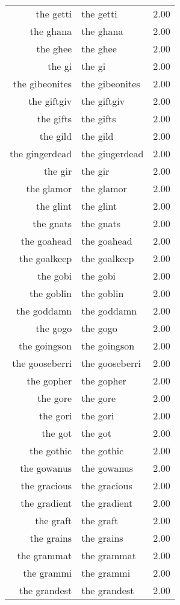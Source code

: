 \begin{table}[ht]
\begin{tabular}{rlr}
  the getti & the getti & 2.00 \\ 
  the ghana & the ghana & 2.00 \\ 
  the ghee & the ghee & 2.00 \\ 
  the gi & the gi & 2.00 \\ 
  the gibeonites & the gibeonites & 2.00 \\ 
  the giftgiv & the giftgiv & 2.00 \\ 
  the gifts & the gifts & 2.00 \\ 
  the gild & the gild & 2.00 \\ 
  the gingerdead & the gingerdead & 2.00 \\ 
  the gir & the gir & 2.00 \\ 
  the glamor & the glamor & 2.00 \\ 
  the glint & the glint & 2.00 \\ 
  the gnats & the gnats & 2.00 \\ 
  the goahead & the goahead & 2.00 \\ 
  the goalkeep & the goalkeep & 2.00 \\ 
  the gobi & the gobi & 2.00 \\ 
  the goblin & the goblin & 2.00 \\ 
  the goddamn & the goddamn & 2.00 \\ 
  the gogo & the gogo & 2.00 \\ 
  the goingson & the goingson & 2.00 \\ 
  the gooseberri & the gooseberri & 2.00 \\ 
  the gopher & the gopher & 2.00 \\ 
  the gore & the gore & 2.00 \\ 
  the gori & the gori & 2.00 \\ 
  the got & the got & 2.00 \\ 
  the gothic & the gothic & 2.00 \\ 
  the gowanus & the gowanus & 2.00 \\ 
  the gracious & the gracious & 2.00 \\ 
  the gradient & the gradient & 2.00 \\ 
  the graft & the graft & 2.00 \\ 
  the grains & the grains & 2.00 \\ 
  the grammat & the grammat & 2.00 \\ 
  the grammi & the grammi & 2.00 \\ 
  the grandest & the grandest & 2.00 \\ 

\end{tabular}
\end{table}
